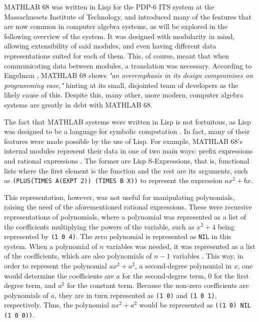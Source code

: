 MATHLAB 68 was written in Lisp for the PDP-6 ITS system at the Massachussets Institute of Technology, and introduced many of the features that are now common in computer algebra systems, as will be explored in the following overview of the system. It was designed with modularity in mind, allowing extensibility of said modules, and even having different data representations suited for each of them. This, of course, meant that when communicating data between modules, a translation was necessary. According to Engelman \parencite*{engelman1971legacy}, MATHLAB 68 shows \textit{"an overemphasis in its design compromises on programming ease,"} hinting at its small, disjointed team of developers as the likely cause of this. Despite this, many other, more modern, computer algebra systems are greatly in debt with MATHLAB 68.

The fact that MATHLAB systems were written in Lisp is not fortuitous, as Lisp was designed to be a language for symbolic computation \parencite{touretzky2013common}. In fact, many of their features were made possible by the use of Lisp. For example, MATHLAB 68's internal modules represent their data in one of two main ways: prefix expressions and rational expressions \parencite{engelman1971legacy}. The former are Lisp S-Expressions, that is, functional lists where the first element is the function and the rest are its arguments, such as \verb|(PLUS(TIMES A(EXPT 2)) (TIMES B X))| to represent the expression $ax^2 + bx$.

This representation, however, was not useful for manipulating polynomials, raising the need of the aforementioned rational expressions. These were recursive representations of polynomials, where a polynomial was represented as a list of the coefficients multiplying the powers of the variable, such as $x^2 + 4$ being represented by \verb|(1 0 4)|. The zero polynomial is represented as \verb|NIL| in this system. When a polynomial of $n$ variables was needed, it was represented as a list of the coefficients, which are also polynomials of $n - 1$ variables \parencite{engelman1971legacy}. This way, in order to represent the polynomial $ax^2 + a^2$, a second-degree polynomial in $x$, one would determine the coefficients are $a$ for the second-degree term, $0$ for the first degree term, and $a^2$ for the constant term. Because the non-zero coefficients are polynomials of $a$, they are in turn represented as \verb|(1 0)| and \verb|(1 0 1)|, respectively. Thus, the polynomial $ax^2 + a^2$ would be represented as \verb|((1 0) NIL (1 0 0))|.

